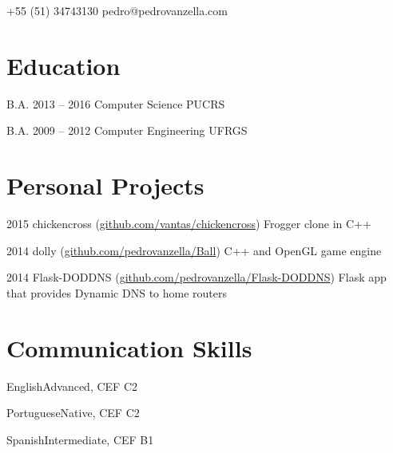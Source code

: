 \documentclass{tccv}
\begin{document}
    {+55 (51) 34743130}
    {pedro@pedrovanzella.com}

\section{Education}

\begin{yearlist}

\item[B.A.]{2013 -- 2016}
     {Computer Science}
     {PUCRS}

\item[B.A.]{2009 -- 2012}
     {Computer Engineering}
     {UFRGS}

\end{yearlist}

\section{Personal Projects}

\begin{yearlist}
  
\item{2015}
     {chickencross (\href{https://github.com/vantas/chickencross}{github.com/vantas/chickencross})}
     {Frogger clone in C++}

\item{2014}
     {dolly (\href{https://github.com/pedrovanzella/Ball}{github.com/pedrovanzella/Ball})}
     {C++ and OpenGL game engine}

\item{2014}
     {Flask-DODDNS (\href{https://github.com/pedrovanzella/Flask-DODDNS}{github.com/pedrovanzella/Flask-DODDNS})}
     {Flask app that provides Dynamic DNS to home routers}

\end{yearlist}

\section{Communication Skills}

\begin{factlist}
\item{English}{Advanced, CEF C2}
\item{Portuguese}{Native, CEF C2}
\item{Spanish}{Intermediate, CEF B1}
\end{factlist}
\end{document}
